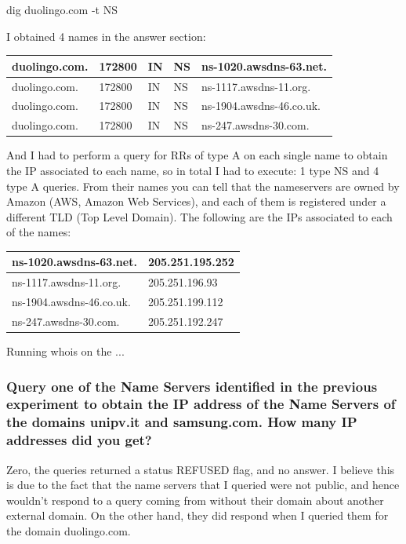 \documentclass[a4paper,10pt]{article}
\begin{document}
dig duolingo.com -t NS 

I obtained 4 names in the answer section:

\begin{table}[h!]
\centering
\begin{tabular}{|l|l|l|l|l|}
\hline
duolingo.com. & 172800 & IN & NS & ns-1020.awsdns-63.net.   \\ \hline
duolingo.com. & 172800 & IN & NS & ns-1117.awsdns-11.org.   \\ \hline
duolingo.com. & 172800 & IN & NS & ns-1904.awsdns-46.co.uk. \\ \hline
duolingo.com. & 172800 & IN & NS & ns-247.awsdns-30.com.    \\ \hline
\end{tabular}
\end{table}

And I had to perform a query for RRs of type A on each single name to obtain the IP associated to each name, so in total I had to execute: 1 type NS and 4 type A queries. From their names you can tell that the nameservers are owned by Amazon (AWS, Amazon Web Services), and each of them is registered under a different TLD (Top Level Domain). The following are the IPs associated to each of the names:

\begin{table}[h!]
\centering
\begin{tabular}{|l|l|}
\hline
ns-1020.awsdns-63.net.   & 205.251.195.252 \\ \hline
ns-1117.awsdns-11.org.   & 205.251.196.93  \\ \hline
ns-1904.awsdns-46.co.uk. & 205.251.199.112 \\ \hline
ns-247.awsdns-30.com.    & 205.251.192.247 \\ \hline
\end{tabular}
\end{table}

Running whois on the ...



\subsubsection{Query one of the Name Servers identified in the previous experiment to obtain the IP address of the Name Servers of the domains unipv.it and samsung.com.
How many IP addresses did you get?}

Zero, the queries returned a status REFUSED flag, and no answer. I believe this is due to the fact that the name servers that I queried were not public, and hence wouldn't respond to a query coming from without their domain about another external domain. On the other hand, they did respond when I queried them for the domain duolingo.com.
\end{document}
